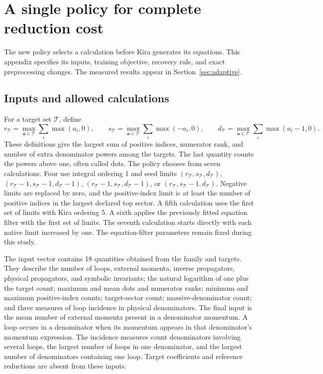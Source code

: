 \section{A single policy for complete reduction cost}
\label{app:adaptive}
The new policy selects a calculation before Kira generates its equations. This appendix specifies its inputs, training objective, recovery rule, and exact preprocessing changes. The measured results appear in Section~\ref{sec:adaptive}.

\subsection{Inputs and allowed calculations}
For a target set $\mathcal{T}$, define
\begin{equation}
 r_{\mathcal{T}}=\max_{\boldsymbol a\in\mathcal{T}}\sum_i\max(a_i,0),\qquad
 s_{\mathcal{T}}=\max_{\boldsymbol a\in\mathcal{T}}\sum_i\max(-a_i,0),\qquad
 d_{\mathcal{T}}=\max_{\boldsymbol a\in\mathcal{T}}\sum_i\max(a_i-1,0).
 \label{eq:adaptive-bounds}
\end{equation}
These definitions give the largest sum of positive indices, numerator rank, and number of extra denominator powers among the targets. The last quantity counts the powers above one, often called dots. The policy chooses from seven calculations. Four use integral ordering 1 and seed limits $(r_{\mathcal{T}},s_{\mathcal{T}},d_{\mathcal{T}})$, $(r_{\mathcal{T}}-1,s_{\mathcal{T}}-1,d_{\mathcal{T}}-1)$, $(r_{\mathcal{T}}-1,s_{\mathcal{T}},d_{\mathcal{T}}-1)$, or $(r_{\mathcal{T}},s_{\mathcal{T}}-1,d_{\mathcal{T}})$. Negative limits are replaced by zero, and the positive-index limit is at least the number of positive indices in the largest declared top sector. A fifth calculation uses the first set of limits with Kira ordering 5. A sixth applies the previously fitted equation filter with the first set of limits. The seventh calculation starts directly with each native limit increased by one. The equation-filter parameters remain fixed during this study.

The input vector contains 18 quantities obtained from the family and targets. They describe the number of loops, external momenta, inverse propagators, physical propagators, and symbolic invariants; the natural logarithm of one plus the target count; maximum and mean dots and numerator ranks; minimum and maximum positive-index counts; target-sector count; massive-denominator count; and three measures of loop incidence in physical denominators. The final input is the mean number of external momenta present in a denominator momentum. A loop occurs in a denominator when its momentum appears in that denominator's momentum expression. The incidence measures count denominators involving several loops, the largest number of loops in one denominator, and the largest number of denominators containing one loop. Target coefficients and reference reductions are absent from these inputs.

